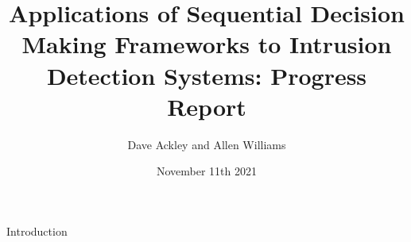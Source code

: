 \documentclass{beamer}
\title[Sequential Decision Making IDS]{Applications of Sequential Decision Making Frameworks to Intrusion Detection Systems: Progress Report}
\author{Dave Ackley and Allen Williams}
\institute{MSU}
\date{November 11th 2021}
\begin{document}
\frame{\titlepage}

\begin{frame}{Introduction}
    
\end{frame}
\end{document}
